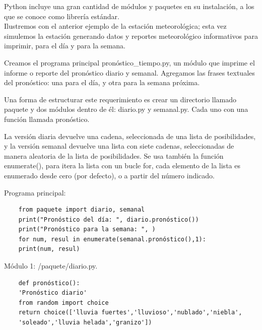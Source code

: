 
Python incluye una gran cantidad de módulos y paquetes en su instalación, a los que se conoce como librería estándar.\\


Ilustremos con el anterior ejemplo de la estación meteorológica; esta vez simulemos la estación generando datos y reportes meteorológico informativos para imprimir, para el día y para la semana. 

Creamos el programa principal {\ttfamily pronóstico\_tiempo.py},  un módulo que imprime el informe o reporte del pronóstico  diario y semanal. Agregamos las frases textuales del pronóstico: una para el día, y  otra para la semana próxima. 

Una forma de estructurar este requerimiento es crear un directorio llamado paquete y dos módulos dentro de él: {\ttfamily diario.py} y {\ttfamily semanal.py}. Cada uno con una función llamada  {\ttfamily pronóstico}. 

La versión diaria devuelve una cadena, seleccionada de una lista de posibilidades, y la versión semanal devuelve una lista con siete cadenas, seleccionadas de manera aleatoria de la lista de posibilidades.
Se usa también la función {\ttfamily enumerate()}, para itera la lista con un bucle {\ttfamily for}, cada elemento de la lista es enumerado desde cero (por defecto), o a partir del número indicado.\vspace{0.15cm}

Programa principal: 

\hspace{-2.7cm}{\ttfamily \scriptsize  pronóstico}

\vspace{-0.2cm}
\hspace{-2.4cm}{\ttfamily \scriptsize \_tiempo.py}\vspace{-0.8cm}
\begin{lstlisting}
	from paquete import diario, semanal
	print("Pronóstico del día: ", diario.pronóstico())
	print("Pronóstico para la semana: ", )
	for num, resul in enumerate(semanal.pronóstico(),1):
	print(num, resul)
\end{lstlisting}

Módulo 1: {\ttfamily \scriptsize/paquete/diario.py}.

\hspace{-2.20cm}{\ttfamily \scriptsize diario.py}  \vspace{-0.52cm}
\begin{lstlisting}
	def pronóstico():
	'Pronóstico diario'
	from random import choice
	return choice(['lluvia fuertes','lluvioso','nublado','niebla',
	'soleado','lluvia helada','granizo'])
\end{lstlisting}

